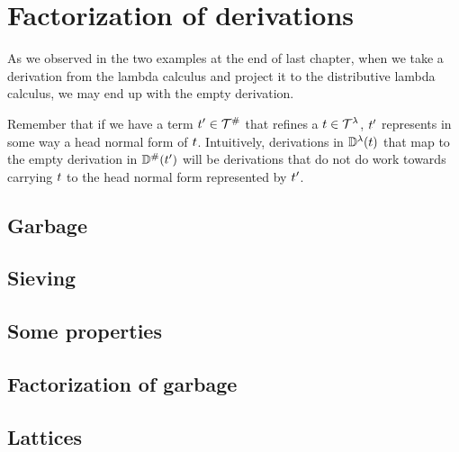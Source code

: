 \chapter{Factorization of derivations}

As we observed in the two examples at the end of last chapter,
when we take a derivation from the lambda calculus and project it
to the distributive lambda calculus, we may end up with the empty derivation.

Remember that if we have a term $t' \in \mathcal{T}^{\mathtt{\#}}$ that refines a $t \in \mathcal{T}^{\lambda}$,
$t'$ represents in some way a head normal form of $t$.
Intuitively, derivations in $\mathbb{D}^{\lambda}(t)$ that map to the empty derivation in
$\mathbb{D}^{\mathtt{\#}}(t')$ will be derivations that do not do work towards carrying
$t$ to the head normal form represented by $t'$.

\section{Garbage}


\section{Sieving}


\section{Some properties}


\section{Factorization of garbage}


\section{Lattices}

